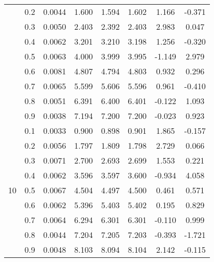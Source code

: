 \documentclass[11pt,a4paper]{report}
\begin{document}
\begin{longtable}{ | c | c || c | c | c | c | c | c | }
 & 0.2 & 0.0044 & 1.600 & 1.594 & 1.602 & 1.166 & -0.371 \\
 & 0.3 & 0.0050 & 2.403 & 2.392 & 2.403 & 2.983 & 0.047 \\
 & 0.4 & 0.0062 & 3.201 & 3.210 & 3.198 & 1.256 & -0.320 \\
 & 0.5 & 0.0063 & 4.000 & 3.999 & 3.995 & -1.149 & 2.979 \\
 & 0.6 & 0.0081 & 4.807 & 4.794 & 4.803 & 0.932 & 0.296 \\
 & 0.7 & 0.0065 & 5.599 & 5.606 & 5.596 & 0.961 & -0.410 \\
 & 0.8 & 0.0051 & 6.391 & 6.400 & 6.401 & -0.122 & 1.093 \\
 & 0.9 & 0.0038 & 7.194 & 7.200 & 7.200 & -0.023 & 0.923 \\
 \hline
\multirow{9}{*}{10} & 0.1 & 0.0033 & 0.900 & 0.898 & 0.901 & 1.865 & -0.157 \\
 & 0.2 & 0.0056 & 1.797 & 1.809 & 1.798 & 2.729 & 0.066 \\
 & 0.3 & 0.0071 & 2.700 & 2.693 & 2.699 & 1.553 & 0.221 \\
 & 0.4 & 0.0062 & 3.596 & 3.597 & 3.600 & -0.934 & 4.058 \\
 & 0.5 & 0.0067 & 4.504 & 4.497 & 4.500 & 0.461 & 0.571 \\
 & 0.6 & 0.0062 & 5.396 & 5.403 & 5.402 & 0.195 & 0.829 \\
 & 0.7 & 0.0064 & 6.294 & 6.301 & 6.301 & -0.110 & 0.999 \\
 & 0.8 & 0.0044 & 7.204 & 7.205 & 7.203 & -0.393 & -1.721 \\
 & 0.9 & 0.0048 & 8.103 & 8.094 & 8.104 & 2.142 & -0.115 \\
 \hline
\hline
\end{longtable}
\end{document}
